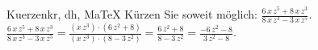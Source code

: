 \begin{MAufgabe}{Kuerzen}{kr, dh, MaTeX}
K\"urzen Sie soweit m\"oglich: $\frac{6\, x\, z^5 + 8\, x\, z^3}{8\, x\, z^3 - 3\, x\, z^5}$.\\ 
\ifLsg\MLoesung
\quad $\frac{6\, x\, z^5 + 8\, x\, z^3}{8\, x\, z^3 - 3\, x\, z^5}=\frac{(x\, z^3)\cdot(6\, z^2 + 8)}{(x\, z^3)\cdot(8 - 3\, z^2)}=\frac{6\, z^2 + 8}{8 - 3\, z^2}=\frac{ - 6\, z^2 - 8}{3\, z^2 - 8}$.\else\relax\fi
 \end{MAufgabe}